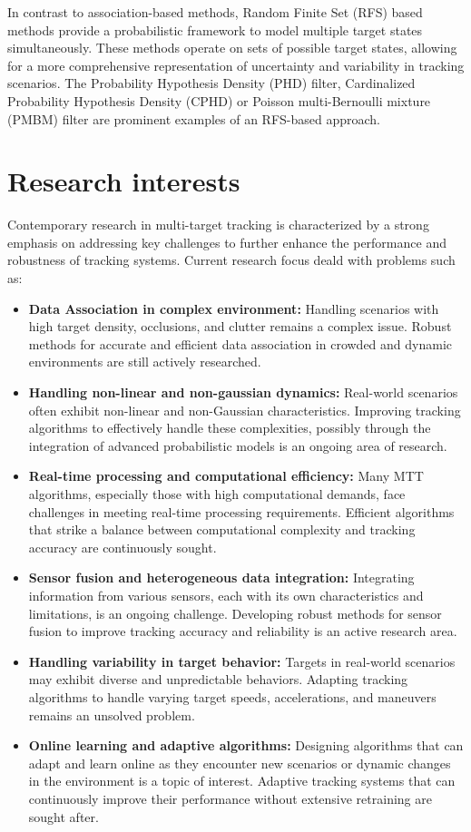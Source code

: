 In contrast to association-based methods, Random Finite Set (RFS) based methods provide a probabilistic framework to model multiple target states simultaneously. These methods operate on sets of possible target states, allowing for a more comprehensive representation of uncertainty and variability in tracking scenarios. The Probability Hypothesis Density (PHD) filter, Cardinalized Probability Hypothesis Density (CPHD) or Poisson multi-Bernoulli mixture (PMBM) filter are prominent examples of an RFS-based approach.

\section{Research interests}
Contemporary research in multi-target tracking is characterized by a strong emphasis on addressing key challenges to further enhance the performance and robustness of tracking systems. Current research focus deald with problems such as:
\begin{itemize}
  \item \textbf{Data Association in complex environment:}  Handling scenarios with high target density, occlusions, and clutter remains a complex issue. Robust methods for accurate and efficient data association in crowded and dynamic environments are still actively researched.
  \item \textbf{Handling non-linear and non-gaussian dynamics:}  Real-world scenarios often exhibit non-linear and non-Gaussian characteristics. Improving tracking algorithms to effectively handle these complexities, possibly through the integration of advanced probabilistic models is an ongoing area of research.
  \item \textbf{Real-time processing and computational efficiency:} Many MTT algorithms, especially those with high computational demands, face challenges in meeting real-time processing requirements. Efficient algorithms that strike a balance between computational complexity and tracking accuracy are continuously sought.
  \item \textbf{Sensor fusion and heterogeneous data integration:} Integrating information from various sensors, each with its own characteristics and limitations, is an ongoing challenge. Developing robust methods for sensor fusion to improve tracking accuracy and reliability is an active research area.
  \item \textbf{Handling variability in target behavior:} Targets in real-world scenarios may exhibit diverse and unpredictable behaviors. Adapting tracking algorithms to handle varying target speeds, accelerations, and maneuvers remains an unsolved problem.
  \item \textbf{Online learning and adaptive algorithms:} Designing algorithms that can adapt and learn online as they encounter new scenarios or dynamic changes in the environment is a topic of interest. Adaptive tracking systems that can continuously improve their performance without extensive retraining are sought after.
\end{itemize}

